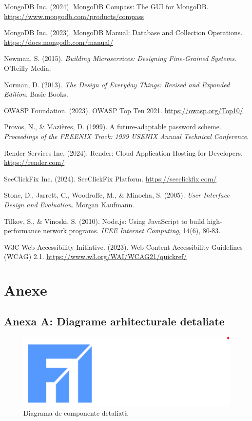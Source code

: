 \documentclass[12pt,a4paper]{report}
\begin{document}
\begin{thebibliography}{99}
MongoDB Inc. (2024). MongoDB Compass: The GUI for MongoDB. \url{https://www.mongodb.com/products/compass}

MongoDB Inc. (2023). MongoDB Manual: Database and Collection Operations. \url{https://docs.mongodb.com/manual/}

Newman, S. (2015). \textit{Building Microservices: Designing Fine-Grained Systems}. O'Reilly Media.

Norman, D. (2013). \textit{The Design of Everyday Things: Revised and Expanded Edition}. Basic Books.

OWASP Foundation. (2023). OWASP Top Ten 2021. \url{https://owasp.org/Top10/}

Provos, N., \& Mazières, D. (1999). A future-adaptable password scheme. \textit{Proceedings of the FREENIX Track: 1999 USENIX Annual Technical Conference}.

Render Services Inc. (2024). Render: Cloud Application Hosting for Developers. \url{https://render.com/}

SeeClickFix Inc. (2024). SeeClickFix Platform. \url{https://seeclickfix.com/}

Stone, D., Jarrett, C., Woodroffe, M., \& Minocha, S. (2005). \textit{User Interface Design and Evaluation}. Morgan Kaufmann.

Tilkov, S., \& Vinoski, S. (2010). Node.js: Using JavaScript to build high-performance network programs. \textit{IEEE Internet Computing}, 14(6), 80-83.

W3C Web Accessibility Initiative. (2023). Web Content Accessibility Guidelines (WCAG) 2.1. \url{https://www.w3.org/WAI/WCAG21/quickref/}

\end{thebibliography}
\newpage
\chapter*{Anexe}

\section*{Anexa A: Diagrame arhitecturale detaliate}

\begin{figure}[H]
\centering
\includegraphics[width=1.0\textwidth]{logo_uaic.png}
\caption{Diagrama de componente detaliată}
\label{fig:detailed_components}
\end{figure}
\end{document}
